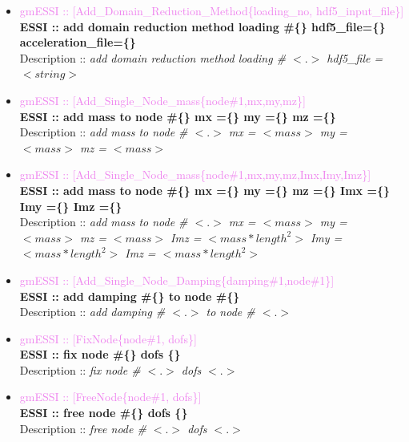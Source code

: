 \documentclass[11pt]{article}
\begin{document}
    \begin{itemize}

        \item \textcolor{violet} {gmESSI :: [Add\_Domain\_Reduction\_Method\{loading\_no, hdf5\_input\_file\}]}\\
        \textbf{ESSI :: add domain reduction method loading \#\{\}  hdf5\_file=\{\} acceleration\_file=\{\}}\\
        Description :: \textit{add domain reduction method loading \# $<.>$ hdf5\_file = $<string>$}

        \item \textcolor{violet} {gmESSI :: [Add\_Single\_Node\_mass\{node\#1,mx,my,mz\}]}\\
        \textbf{ESSI :: add mass to node \#\{\} mx =\{\} my =\{\} mz =\{\} }\\
        Description :: \textit{add mass to node \# $<.>$ mx = $<mass>$ my = $<mass>$ mz = $<mass>$}

        \item \textcolor{violet} {gmESSI :: [Add\_Single\_Node\_mass\{node\#1,mx,my,mz,Imx,Imy,Imz\}]}\\
        \textbf{ESSI :: add mass to node \#\{\} mx =\{\} my =\{\} mz =\{\} Imx =\{\} Imy =\{\} Imz =\{\}}\\
        Description :: \textit{add mass to node \# $<.>$ mx = $<mass>$ my = $<mass>$ mz = $<mass>$ Imz = $<mass*length^2>$ Imy = $<mass*length^2>$ Imz = $<mass*length^2>$}

        \item \textcolor{violet} {gmESSI :: [Add\_Single\_Node\_Damping\{damping\#1,node\#1\}]}\\
        \textbf{ESSI :: add damping \#\{\} to node \#\{\}}\\
        Description :: \textit{add damping \# $<.>$ to node \# $<.>$}

        \item \textcolor{violet} {gmESSI :: [FixNode\{node\#1, dofs\}]}\\
        \textbf{ESSI :: fix node \#\{\} dofs \{\}}\\
        Description :: \textit{fix node \# $<.>$ dofs $<.>$}

        \item \textcolor{violet} {gmESSI :: [FreeNode\{node\#1, dofs\}]}\\
        \textbf{ESSI :: free node \#\{\} dofs \{\}}\\
        Description :: \textit{free node \# $<.>$ dofs $<.>$}


\end{itemize}
\end{document}
